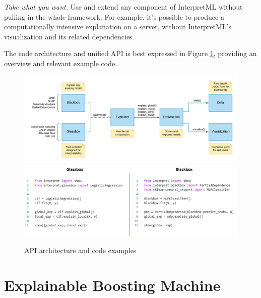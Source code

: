 \documentclass[twoside,11pt]{article}
\begin{document}
\textit{Take what you want.} Use and extend any component of InterpretML without pulling in the whole framework. For example, it's possible to produce a computationally intensive explanation on a server, without InterpretML's visualization and its related dependencies.

The code architecture and unified API is best expressed in Figure \ref{fig:interpret_arch}, providing an overview and relevant example code.

\begin{figure}[H]
    \centering
    \includegraphics[scale=0.6]{images/architecture.png}
    \includegraphics[scale=0.5]{images/Code_Screenshots.png}
    \caption{API architecture and code examples}
    \label{fig:interpret_arch}
\end{figure}

\section{Explainable Boosting Machine}
\end{document}

